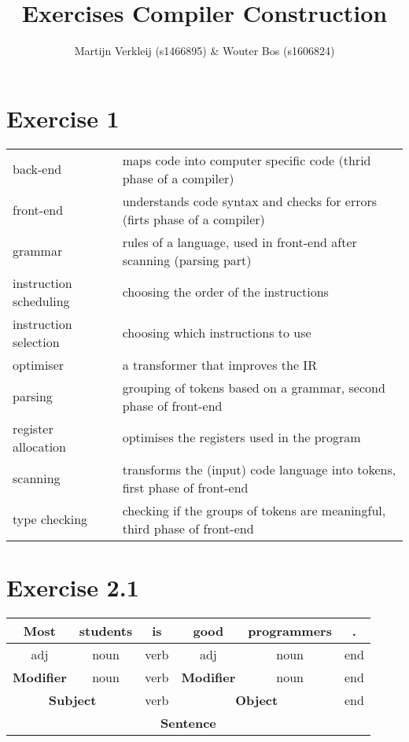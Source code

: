 \documentclass[11pt]{article} %
\title{Exercises Compiler Construction}
\author{Martijn Verkleij (s1466895) \& Wouter Bos (s1606824)}
\begin{document}
\maketitle

\section*{Exercise 1}
\begin{tabular}{ll}
back-end					& maps code into computer specific code (thrid phase of a compiler)				\\
front-end					& understands code syntax and checks for errors (firts phase of a compiler)		\\
grammar						& rules of a language, used in front-end after scanning (parsing part)			\\
instruction scheduling		& choosing the order of the instructions										\\
instruction selection		& choosing which instructions to use											\\
optimiser					& a transformer that improves the IR											\\
parsing						& grouping of tokens based on a grammar, second phase of front-end				\\
register allocation			& optimises the registers used in the program									\\
scanning					& transforms the (input) code language into tokens, first phase of front-end	\\
type checking				& checking if the groups of tokens are meaningful, third phase of front-end		\\
\end{tabular}


\section*{Exercise 2.1}
\begin{tabular}{|c|c|c|c|c|c|}	\hline
Most 				& students 			& is 	& good 					& programmers 	& . 		\\\hline
adj 				& noun 				& verb 	& adj 					& noun 			& end 		\\\hline
\textbf{Modifier}	& noun				& verb	& \textbf{Modifier}		& noun			& end		\\\hline
\multicolumn{2}{|c|}{\textbf{Subject}}	& verb 	& \multicolumn{2}{c|}{\textbf{Object}}	& end		\\\hline
\multicolumn{6}{|c|}{\textbf{Sentence}}																\\\hline
\end{tabular}
\end{document}
